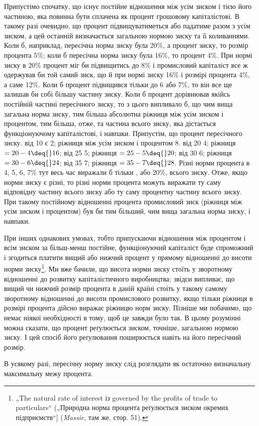 
Припустімо спочатку, що існує постійне відношення між усім
зиском і тією його частиною, яка повинна бути сплачена як процент
грошовому капіталістові. В такому разі очевидно, що процент
підвищуватиметься або падатиме разом з усім зиском, а цей
останній визначається загальною нормою зиску та її коливаннями.
Коли б, наприклад, пересічна норма зиску була \deq{} 20\%, а процент
\deq{}  зиску, то розмір процента \deq{} 5\%; коли б пересічна
норма зиску була \deq{} 16\%, то процент \deq{} 4\%. При нормі зиску в
20\% процент міг би підвищитись до 8\% і промисловий капіталіст
все ж одержував би той самий зиск, що й при нормі зиску
\deq{} 16\% і розмірі процента \deq{} 4\%, а саме 12\%. Коли б процент
підвищився тільки до 6 або 7\%, то він все ще залишав би собі
більшу частину зиску. Коли б процент дорівнював якійсь постійній
частині пересічного зиску, то з цього випливало б, що
чим вища загальна норма зиску, тим більша абсолютна ріжниця
між усім зиском і процентом, тим більша, отже, та частина
всього зиску, яка дістається функціонуючому капіталістові, і навпаки.
Припустім, що процент \deq{}  пересічного зиску.  від 10
є 2; ріжниця між усім зиском і процентом \deq{} 8.  від 20 \deq{} 4;
ріжниця $= 20 - 4 \deq{} 16$;  від 25 \deq{} 5; ріжниця $= 25 - 5 \deq{} 20$;  від
30 \deq{} 6; ріжниця $= 30 - 6 \deq{} 24$;  від 35 \deq{} 7; ріжниця $= 35 - 7 \deq{} 28$.
Різні норми процента в 4, 5, 6, 7\% тут весь час виражали б
тільки , або 20\%, всього зиску. Отже, якщо норми зиску є різні,
то різні норми процента можуть виражати ту саму відповідну
частину всього зиску або ту саму процентну частину всього
зиску. При такому постійному відношенні процента промисловий
зиск (ріжниця між усім зиском і процентом) був би тим більший,
чим вища загальна норма зиску, і навпаки.

При інших однакових умовах, тобто припускаючи відношення
між процентом і всім зиском за більш-менш постійне, функціонуючий
капіталіст буде спроможний і згодиться платити вищий
або нижчий процент у прямому відношенні до висоти норми
зиску\footnote{
„The natural rate of interest із governed by the profits of trade to particulars“
(„Природна норма процента реґулюється зиском окремих підприємств“]
(\emph{Massie}, там же, стор. 51).
}. Ми вже бачили, що висота норми зиску стоїть у зворотному
відношенні до розвитку капіталістичного виробництва;
звідси випливає, що вищий чи нижчий розмір процента в даній
країні стоїть у такому самому зворотному відношенні до висоти
промислового розвитку, якщо тільки ріжниця в розмірі
процента дійсно виражає ріжницю норм зиску. Пізніше ми побачимо,
що немає ніякої необхідності в тому, щоб це завжди
було так. В цьому розумінні можна сказати, що процент реґулюється
зиском, точніше, загальною нормою зиску. І цей спосіб
його реґулювання поширюється навіть на його пересічний розмір.

В усякому разі, пересічну норму зиску слід розглядати як
остаточно визначальну максимальну межу процента.
